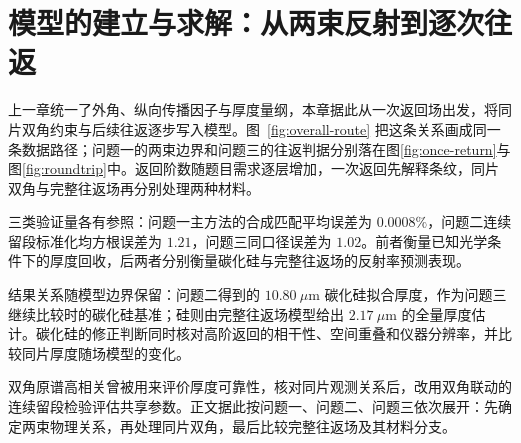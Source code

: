 \section{模型的建立与求解：从两束反射到逐次往返}

上一章统一了外角、纵向传播因子与厚度量纲，本章据此从一次返回场出发，将同片双角约束与后续往返逐步写入模型。图~\ref{fig:overall-route} 把这条关系画成同一条数据路径；问题一的两束边界和问题三的往返判据分别落在图\ref{fig:once-return}与图\ref{fig:roundtrip}中。返回阶数随题目需求逐层增加，一次返回先解释条纹，同片双角与完整往返场再分别处理两种材料。%

三类验证量各有参照：问题一主方法的合成匹配平均误差为 $0.0008\%$，问题二连续留段标准化均方根误差为 $1.21$，问题三同口径误差为 $1.02$。前者衡量已知光学条件下的厚度回收，后两者分别衡量碳化硅与完整往返场的反射率预测表现。%

结果关系随模型边界保留：问题二得到的 $10.80\ \mu\mathrm{m}$ 碳化硅拟合厚度，作为问题三继续比较时的碳化硅基准；硅则由完整往返场模型给出 $2.17\ \mu\mathrm{m}$ 的全量厚度估计。碳化硅的修正判断同时核对高阶返回的相干性、空间重叠和仪器分辨率，并比较同片厚度随场模型的变化。%

双角原谱高相关曾被用来评价厚度可靠性，核对同片观测关系后，改用双角联动的连续留段检验评估共享参数。正文据此按问题一、问题二、问题三依次展开：先确定两束物理关系，再处理同片双角，最后比较完整往返场及其材料分支。%
